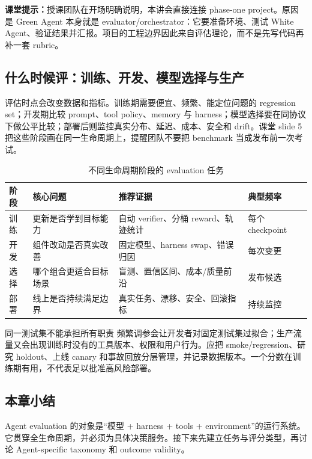\textbf{课堂提示：}授课团队在开场明确说明，本讲会直接连接 phase-one project。原因是 Green Agent 本身就是 evaluator/orchestrator：它要准备环境、测试 White Agent、验证结果并汇报。项目的工程边界因此来自评估理论，而不是先写代码再补一套 rubric。

\subsection{什么时候评：训练、开发、模型选择与生产}

评估时点会改变数据和指标。训练期需要便宜、频繁、能定位问题的 regression set；开发期比较 prompt、tool policy、memory 与 harness；模型选择要在同协议下做公平比较；部署后则监控真实分布、延迟、成本、安全和 drift。课堂 slide 5 把这些阶段画在同一生命周期上，提醒团队不要把 benchmark 当成发布前一次考试。

\begin{table}[H]
\centering
\begin{tabular}{p{2.2cm}p{3.5cm}p{4.2cm}p{2.5cm}}
\toprule
\textbf{阶段} & \textbf{核心问题} & \textbf{推荐证据} & \textbf{典型频率} \\
\midrule
训练 & 更新是否学到目标能力 & 自动 verifier、分桶 reward、轨迹统计 & 每个 checkpoint \\
开发 & 组件改动是否真实改善 & 固定模型、harness swap、错误归因 & 每次变更 \\
选择 & 哪个组合更适合目标场景 & 盲测、置信区间、成本/质量前沿 & 发布候选 \\
部署 & 线上是否持续满足边界 & 真实任务、漂移、安全、回滚指标 & 持续监控 \\
\bottomrule
\end{tabular}
\caption{不同生命周期阶段的 evaluation 任务}
\end{table}

\begin{warningbox}{同一测试集不能承担所有职责}
频繁调参会让开发者对固定测试集过拟合；生产流量又会出现训练时没有的工具版本、权限和用户行为。应把 smoke/regression、研究 holdout、上线 canary 和事故回放分层管理，并记录数据版本。一个分数在训练期有用，不代表足以批准高风险部署。
\end{warningbox}

\subsection{本章小结}

Agent evaluation 的对象是“模型 + harness + tools + environment”的运行系统。它贯穿全生命周期，并必须为具体决策服务。接下来先建立任务与评分类型，再讨论 Agent-specific taxonomy 和 outcome validity。


